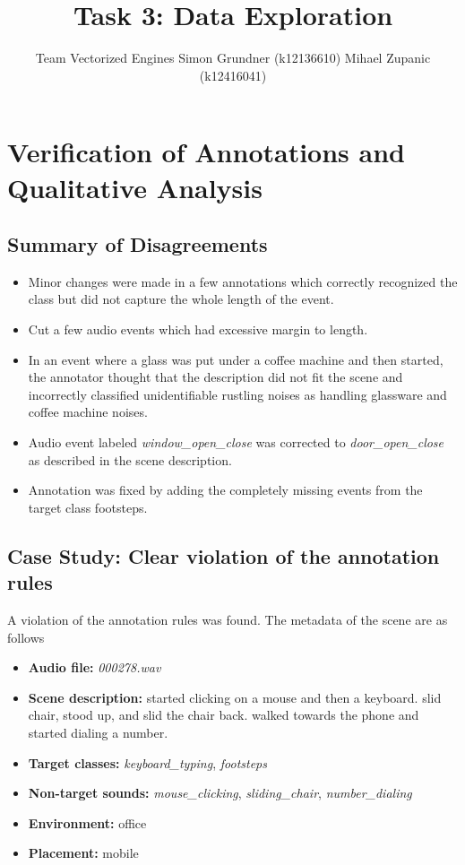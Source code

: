 \documentclass{article}
\title{Task 3: Data Exploration}
\author{%
  Team Vectorized Engines \AND
  Simon Grundner (k12136610)
  \And
  Mihael Zupanic (k12416041)
}
\begin{document}
\maketitle

\section{Verification of Annotations and Qualitative Analysis}

\subsection{Summary of Disagreements}

\begin{itemize}
    \item Minor changes were made in a few annotations which correctly recognized the class but did not capture the whole length of the event.
    \item Cut a few audio events which had excessive margin to length.
    \item In an event where a glass was put under a coffee machine and then started, the annotator thought that the description did not fit the scene and incorrectly classified unidentifiable rustling noises as handling glassware and coffee machine noises.
    \item Audio event labeled \emph{window\_open\_close} was corrected to \emph{door\_open\_close} as described in the scene description.
    \item Annotation was fixed by adding the completely missing events from the target class footsteps.
\end{itemize}

\subsection{Case Study: Clear violation of the annotation rules}

A violation of the annotation rules was found. The metadata of the scene are as follows

\begin{itemize}
    \item \textbf{Audio file:} \emph{000278.wav}
    \item \textbf{Scene description:} started clicking on a mouse and then a keyboard. slid chair, stood up, and slid the chair back. walked towards the phone and started dialing a number.
    \item \textbf{Target classes:} \emph{keyboard\_typing}, \emph{footsteps}
    \item \textbf{Non-target sounds:} \emph{mouse\_clicking}, \emph{sliding\_chair}, \emph{number\_dialing}
    \item \textbf{Environment:} office 
    \item \textbf{Placement:} mobile
\end{itemize}
\end{document}
